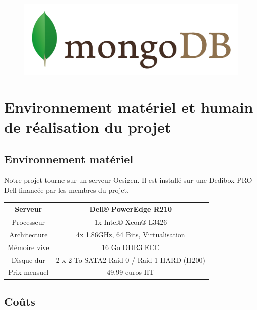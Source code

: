 \documentclass{life-fr}
\begin{document}
\begin{figure}[H]
  \begin{center}
    \includegraphics[width=13cm]{img/mongodb.png}
  \end{center}
\end{figure}


\chapter{Environnement matériel et humain de réalisation du projet}

\section{Environnement matériel}

Notre projet tourne sur un serveur Ocsigen. Il est installé sur une Dedibox PRO Dell financée par les membres du projet.

\vspace{20pt}

\begin{tabular}{|c|c|}
  \hline
   Serveur & Dell® PowerEdge R210\\
  \hline
  Processeur & 1x Intel® Xeon® L3426\\
  \hline
  Architecture & 4x 1.86GHz, 64 Bits, Virtualisation\\
  \hline
  Mémoire vive & 16 Go DDR3 ECC\\
  \hline
  Disque dur & 2 x 2 To SATA2 Raid 0 / Raid 1 HARD (H200)\\
  \hline
  Prix mensuel & 49,99 euros HT\\
  \hline
\end{tabular}

\vspace{20pt}

\section{Coûts}
\end{document}
